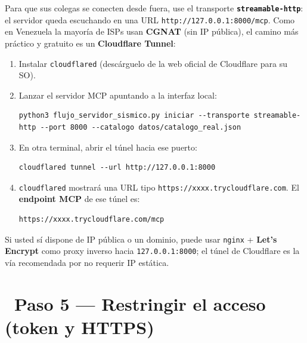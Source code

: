 \documentclass[11pt,a4paper]{article}
\newcommand{\iconotexto}[2]{\textcolor{cyanNeon}{\faIcon{#1}}~#2}
\begin{document}
Para que sus colegas se conecten desde fuera, use el transporte \textbf{\texttt{streamable-http}}:
el servidor queda escuchando en una URL \texttt{http://127.0.0.1:8000/mcp}. Como en Venezuela la
mayor\'ia de ISPs usan \textbf{CGNAT} (sin IP p\'ublica), el camino m\'as pr\'actico y gratuito es un
\textbf{Cloudflare Tunnel}:

\begin{enumerate}[leftmargin=1.8em, itemsep=4pt]
  \item Instalar \texttt{cloudflared} (desc\'arguelo de la web oficial de Cloudflare para su SO).
  \item Lanzar el servidor MCP apuntando a la interfaz local:
\begin{lstlisting}
python3 flujo_servidor_sismico.py iniciar --transporte streamable-http --port 8000 --catalogo datos/catalogo_real.json
\end{lstlisting}
  \item En otra terminal, abrir el t\'unel hacia ese puerto:
\begin{lstlisting}
cloudflared tunnel --url http://127.0.0.1:8000
\end{lstlisting}
  \item \texttt{cloudflared} mostrar\'a una URL tipo \texttt{https://xxxx.trycloudflare.com}.
        El \textbf{endpoint MCP} de ese t\'unel es:
\begin{lstlisting}
https://xxxx.trycloudflare.com/mcp
\end{lstlisting}
\end{enumerate}

\begin{tcolorbox}[cajaRecomendacion, title={\faIcon{globe}~Acceso alternativo con IP p\'ublica}]
Si usted s\'i dispone de IP p\'ublica o un dominio, puede usar \texttt{nginx} + \textbf{Let's
Encrypt} como proxy inverso hacia \texttt{127.0.0.1:8000}; el t\'unel de Cloudflare es la v\'ia
recomendada por no requerir IP est\'atica.
\end{tcolorbox}

\section{\iconotexto{lock}{Paso 5 --- Restringir el acceso (token y HTTPS)}}
\end{document}
